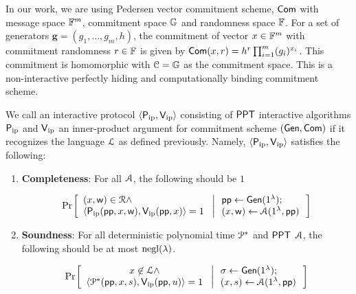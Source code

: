 In our work, we are using Pedersen vector commitment scheme, $\mathsf{Com}$ with message space $\mathbb{F}^m$, commitment space $\mathbb{G}$ and randomness space $\mathbb{F}$. For a set of generators $\bm{g}=(g_1,\ldots,g_m,h)$, the commitment of vector $x\in \mathbb{F}^m$ with commitment randomness $r\in \mathbb{F}$ is given by $\mathsf{Com}(x,r)=h^r \prod_{i=1}^m (g_i)^{x_i} $. This commitment is homomorphic with $\mathcal{C}=\mathbb{G}$ as the commitment space. This is a non-interactive perfectly hiding and computationally binding commitment scheme.

\begin{definition}\label{defn:innerproductarg} 
	We call an interactive protocol $\langle \mathsf{P}_\mathrm{ip},\mathsf{V}_\mathrm{ip}\rangle$ consisting of $\mathsf{PPT}$ interactive algorithms $\mathsf{P}_\mathrm{ip}$ and $\mathsf{V}_\mathrm{ip}$ an inner-product argument for commitment scheme $(\mathsf{Gen},\mathsf{Com})$ if it recognizes the language $\mathcal{L}$ as defined previously. Namely, $\langle \mathsf{P}_\mathrm{ip},\mathsf{V}_\mathrm{ip}\rangle$ satisfies the following:
	\begin{enumerate}[{\rm (i)}]
		\item {\bf Completeness}: For all $\mathcal{A}$, the following should be $1$
		
		\footnotesize %
		\begin{align*}
		\condprob{
			\begin{array}{l}
			(\stmt,\wit)\in \calR \wedge \\ \langle \pip(\mathsf{pp},\stmt,\wit),\vip(\mathsf{pp},\stmt)\rangle=1
			\end{array}}{
			\begin{array}{l}
			\mathsf{pp}\gets \gen(\secparam);\\
			(\stmt,\wit)\gets \adv(\secparam,\mathsf{pp})
			\end{array}
		}
		\end{align*}
		\normalsize
		\item{\bf Soundness}: For all deterministic polynomial time $\mathcal{P}^*$ and $\mathsf{PPT}$  $\mathcal{A}$, the following should be at most $\mathrm{negl}(\lambda)$.
		
		{\footnotesize %
			
			\begin{align*}
			\condprob{
				\begin{array}{c}
				\stmt\not\in \calL \wedge \\
				\langle
				\prover^*(\mathsf{pp},\stmt,s),\vip(\mathsf{pp},u)\rangle=1
				\end{array}}{
				\begin{array}{l}
				\sigma\gets \gen(\secparam);\\
				(\stmt,s)\gets \adv(\secparam,\mathsf{pp})
				\end{array}
			} 
			\end{align*}
		}
	\end{enumerate}
	
\end{definition}
